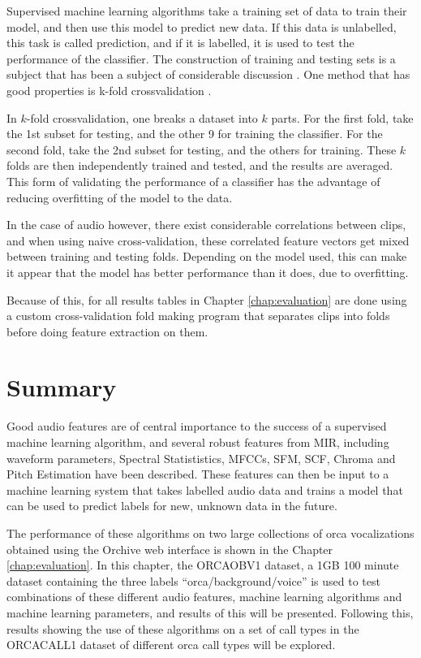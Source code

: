 Supervised machine learning algorithms take a training set of data to
train their model, and then use this model to predict new data.  If
this data is unlabelled, this task is called prediction, and if it is
labelled, it is used to test the performance of the classifier.  The
construction of training and testing sets is a subject that has been a
subject of considerable discussion \cite{efron1983leisurely}.  One
method that has good properties is k-fold crossvalidation
\cite{kohavi1995study}.

In $k$-fold crossvalidation, one breaks a dataset into $k$ parts.  For
the first fold, take the 1st subset for testing, and the other 9 for
training the classifier.  For the second fold, take the 2nd subset for
testing, and the others for training.  These $k$ folds are then
independently trained and tested, and the results are averaged.  This
form of validating the performance of a classifier has the advantage
of reducing overfitting of the model to the data.

In the case of audio however, there exist considerable correlations
between clips, and when using naive cross-validation, these correlated
feature vectors get mixed between training and testing folds.
Depending on the model used, this can make it appear that the model
has better performance than it does, due to overfitting.  

Because of this, for all results tables in Chapter
\ref{chap:evaluation} are done using a custom cross-validation fold
making program that separates clips into folds before doing feature
extraction on them.

\section{Summary}

Good audio features are of central importance to the success of a
supervised machine learning algorithm, and several robust features
from MIR, including waveform parameters, Spectral Statististics,
MFCCs, SFM, SCF, Chroma and Pitch Estimation have been described.
These features can then be input to a machine learning system that
takes labelled audio data and trains a model that can be used to
predict labels for new, unknown data in the future.

The performance of these algorithms on two large collections of orca
vocalizations obtained using the Orchive web interface is shown in the
Chapter \ref{chap:evaluation}.  In this chapter, the ORCAOBV1 dataset,
a 1GB 100 minute dataset containing the three labels
``orca/background/voice'' is used to test combinations of these
different audio features, machine learning algorithms and machine
learning parameters, and results of this will be presented.  Following
this, results showing the use of these algorithms on a set of
\totalClipsInORCACALL call types in the ORCACALL1 dataset of
\totalCallsInORCACALL different orca call types will be explored.


